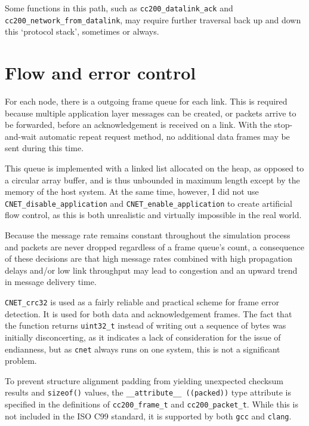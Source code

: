\documentclass[a4paper,12pt,titlepage]{article}
\begin{document}
Some functions in this path, such as \texttt{cc200\_datalink\_ack} and
\texttt{cc200\_network\_from\_datalink}, may require further traversal back up
and down this `protocol stack', sometimes or always.

\section{Flow and error control}

For each node, there is a outgoing frame queue for each link. This is required
because multiple application layer messages can be created, or packets arrive
to be forwarded, before an acknowledgement is received on a link. With the
stop-and-wait automatic repeat request method, no additional data frames may
be sent during this time.

This queue is implemented with a linked list allocated on the heap, as opposed
to a circular array buffer, and is thus unbounded in maximum length except by
the memory of the host system. At the same time, however, I did not use
\texttt{CNET\_disable\_application} and \texttt{CNET\_enable\_application} to
create artificial flow control, as this is both unrealistic and virtually
impossible in the real world.

Because the message rate remains constant throughout the simulation process and
packets are never dropped regardless of a frame queue's count, a consequence of
these decisions are that high message rates combined with high propagation
delays and/or low link throughput may lead to congestion and an upward trend in
message delivery time.

\texttt{CNET\_crc32} is used as a fairly reliable and practical scheme for
frame error detection. It is used for both data and acknowledgement frames. The
fact that the function returns \texttt{uint32\_t} instead of writing out a
sequence of bytes was initially disconcerting, as it indicates a lack of
consideration for the issue of endianness, but as \texttt{cnet} always runs on
one system, this is not a significant problem.

To prevent structure alignment padding from yielding unexpected checksum
results and \texttt{sizeof()} values, the \texttt{\_\_attribute\_\_ ((packed))}
type attribute is specified in the definitions of \texttt{cc200\_frame\_t} and
\texttt{cc200\_packet\_t}. While this is not included in the ISO C99 standard,
it is supported by both \texttt{gcc} and \texttt{clang}.
\end{document}
